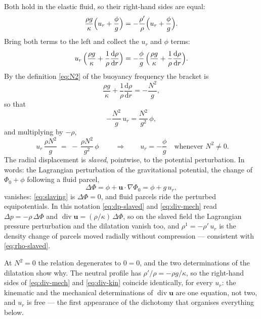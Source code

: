 \documentclass[11pt]{article}
\newcommand{\bu}{\mathbf{u}}
\newcommand{\Div}{\operatorname{div}}
\begin{document}
Both hold in the elastic fluid, so their right-hand sides are equal:
\begin{equation}
  \frac{\rho g}{\kappa}\Bigl(u_r + \frac{\phi}{g}\Bigr)
  = -\frac{\rho'}{\rho}\Bigl(u_r + \frac{\phi}{g}\Bigr) .
\end{equation}
Bring both terms to the left and collect the $u_r$ and $\phi$ terms:
\begin{equation}
  u_r\,\Bigl(\frac{\rho g}{\kappa} + \frac{1}{\rho}\frac{\mathrm{d}\rho}{\mathrm{d}r}\Bigr)
  = -\frac{\phi}{g}\,
    \Bigl(\frac{\rho g}{\kappa} + \frac{1}{\rho}\frac{\mathrm{d}\rho}{\mathrm{d}r}\Bigr) .
\end{equation}
By the definition \eqref{eq:N2} of the buoyancy frequency the bracket
is
\begin{equation}
  \frac{\rho g}{\kappa} + \frac{1}{\rho}\frac{\mathrm{d}\rho}{\mathrm{d}r}
  = -\frac{N^2}{g} ,
\end{equation}
so that
\begin{equation}
  -\frac{N^2}{g}\,u_r = \frac{N^2}{g^2}\,\phi ,
\end{equation}
and multiplying by $-\rho$,
\begin{equation}
  \boxed{\;u_r\,\frac{\rho N^2}{g}
   \;=\; -\,\frac{\rho N^2}{g^2}\,\phi\;}
  \qquad\Longrightarrow\qquad
  u_r = -\frac{\phi}{g}
  \quad\text{whenever } N^2 \neq 0 .
  \label{eq:slaving}
\end{equation}
The radial displacement is \emph{slaved}, pointwise, to the potential
perturbation. In words: the Lagrangian perturbation of the
gravitational potential, the change of $\Phi_0 + \phi$ following a
fluid parcel,
\begin{equation}
  \Delta\Phi = \phi + \bu\cdot\nabla\Phi_0 = \phi + g\,u_r ,
  \label{eq:dPhi}
\end{equation}
vanishes: \eqref{eq:slaving} is $\Delta\Phi = 0$, and fluid parcels ride
the perturbed equipotentials. In this notation \eqref{eq:dp-slaved} and
\eqref{eq:div-mech} read $\Delta p = -\rho\,\Delta\Phi$ and
$\Div\bu = (\rho/\kappa)\,\Delta\Phi$, so on the slaved field the
Lagrangian pressure perturbation and the dilatation vanish too, and
$\rho^1 = -\rho'\,u_r$ is the density change of parcels moved radially
without compression --- consistent with \eqref{eq:rho-slaved}.

At $N^2 = 0$ the relation degenerates to $0 = 0$, and the two
determinations of the dilatation show why. The neutral profile has
$\rho'/\rho = -\rho g/\kappa$, so the right-hand sides of
\eqref{eq:div-mech} and \eqref{eq:div-kin} coincide identically, for
every $u_r$: the kinematic and the mechanical determinations of
$\Div\bu$ are one equation, not two, and $u_r$ is free --- the first
appearance of the dichotomy that organises everything below.
\end{document}
